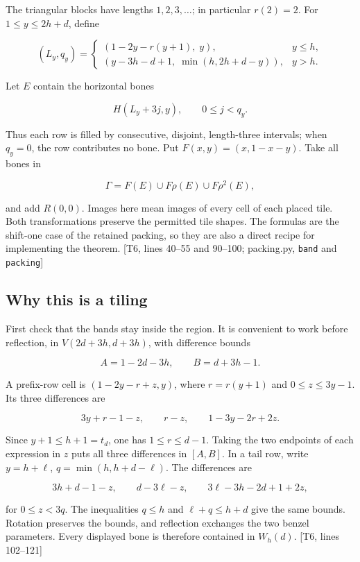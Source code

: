 \documentclass[
  11pt,
]{article}
\begin{document}
The triangular blocks have lengths \(1,2,3,\ldots\); in particular
\(r(2)=2\). For \(1\le y\le2h+d\), define

\[
(L_y,q_y)=
\begin{cases}
(1-2y-r(y+1),\;y),&y\le h,\\
(y-3h-d+1,\;\min(h,2h+d-y)),&y>h.
\end{cases}
\]

Let \(E\) contain the horizontal bones

\[
H(L_y+3j,y),\qquad 0\le j<q_y.
\]

Thus each row is filled by consecutive, disjoint, length-three
intervals; when \(q_y=0\), the row contributes no bone. Put
\(F(x,y)=(x,1-x-y)\). Take all bones in

\[
\Gamma=F(E)\cup F\rho(E)\cup F\rho^2(E),
\]

and add \(R(0,0)\). Images here mean images of every cell of each placed
tile. Both transformations preserve the permitted tile shapes. The
formulas are the shift-one case of the retained packing, so they are
also a direct recipe for implementing the theorem. {[}T6, lines 40--55
and 90--100; packing.py, \texttt{band} and \texttt{packing}{]}

\subsection{Why this is a tiling}\label{why-this-is-a-tiling}

First check that the bands stay inside the region. It is convenient to
work before reflection, in \(V(2d+3h,d+3h)\), with difference bounds

\[
A=1-2d-3h,\qquad B=d+3h-1.
\]

A prefix-row cell is \((1-2y-r+z,y)\), where \(r=r(y+1)\) and
\(0\le z\le3y-1\). Its three differences are

\[
3y+r-1-z,\qquad r-z,\qquad1-3y-2r+2z.
\]

Since \(y+1\le h+1=t_d\), one has \(1\le r\le d-1\). Taking the two
endpoints of each expression in \(z\) puts all three differences in
\([A,B]\). In a tail row, write \(y=h+\ell\), \(q=\min(h,h+d-\ell)\).
The differences are

\[
3h+d-1-z,\qquad d-3\ell-z,\qquad3\ell-3h-2d+1+2z,
\]

for \(0\le z<3q\). The inequalities \(q\le h\) and \(\ell+q\le h+d\)
give the same bounds. Rotation preserves the bounds, and reflection
exchanges the two benzel parameters. Every displayed bone is therefore
contained in \(W_h(d)\). {[}T6, lines 102--121{]}
\end{document}
